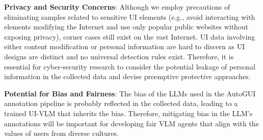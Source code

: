 \noindent\textbf{Privacy and Security Concerns}: Although we employ precautions of eliminating samples related to sensitive UI elements (e.g., avoid interacting with elements modifying the Internet and use only popular public websites without exposing privacy), corner cases still exist on the vast Internet. UI data involving either content modification or personal information are hard to discern as UI designs are distinct and no universal detection rules exist. Therefore, it is essential for cyber-security research to consider the potential leakage of personal information in the collected data and devise preemptive protective approaches.

\noindent\textbf{Potential for Bias and Fairness}: The bias of the LLMs used in the AutoGUI annotation pipeline is probably reflected in the collected data, leading to a trained UI-VLM that inherits the bias. Therefore, mitigating bias in the LLM's annotations will be important for developing fair VLM agents that align with the values of users from diverse cultures.